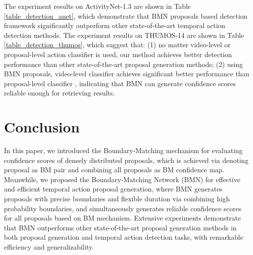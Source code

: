 \documentclass[10pt,twocolumn,letterpaper]{article}
\begin{document}
The experiment results on ActivityNet-1.3 are shown in Table \ref{table_detection_anet}, which demonstrate that BMN proposals based detection framework significantly outperform other state-of-the-art temporal action detection methods.
The experiment results on THUMOS-14 are shown in Table \ref{table_detection_thumos}, which suggest that:
(1) no matter video-level or proposal-level action classifier is used, our method achieves better detection performance than other state-of-the-art proposal generation methods;
(2) using BMN proposals, video-level classifier \cite{wang2017untrimmednets} achieves significant better performance than proposal-level classifier \cite{shou2016action}, indicating that BMN can generate  confidence scores reliable enough for retrieving  results.


\section{Conclusion}

In this paper, we introduced the Boundary-Matching mechanism for evaluating confidence scores of densely distributed proposals, which is achieved via denoting proposal as BM pair and combining all proposals as BM confidence map. 
Meanwhile, we proposed the Boundary-Matching Network (BMN) for effective and efficient temporal action proposal generation, where BMN generates proposals with precise boundaries and flexible duration via combining high probability boundaries, and simultaneously generates reliable confidence scores for all proposals based on BM mechanism.
Extensive experiments demonstrate that BMN outperforms other state-of-the-art proposal generation methods in both  proposal generation and temporal action detection tasks, with remarkable efficiency and  generalizability.


{\small


}
\end{document}
